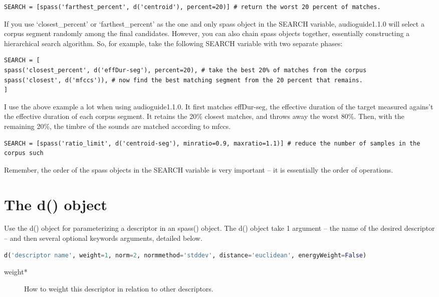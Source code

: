 \documentclass{article}
\newcommand{\ag}{audioguide1.1.0\xspace}
\begin{document}
\begin{spacing}{1.2}
\begin{lstlisting}
SEARCH = [spass('farthest_percent', d('centroid'), percent=20)] # return the worst 20 percent of matches.
\end{lstlisting}

If you use `closest\_percent' or `farthest\_percent' as the one and only spass object in the SEARCH variable, \ag will select a corpus segment randomly among the final candidates.  However, you can also chain spass objects together, essentially constructing a hierarchical search algorithm.  So, for example, take the following SEARCH variable with two separate phases:

\begin{lstlisting}
SEARCH = [
spass('closest_percent', d('effDur-seg'), percent=20), # take the best 20% of matches from the corpus
spass('closest', d('mfccs')), # now find the best matching segment from the 20 percent that remains.
] 
\end{lstlisting}

I use the above example a lot when using \ag.  It first matches effDur-seg, the effective duration of the target measured agains't the effective duration of each corpus segment.  It retains the 20\% closest matches, and throws away the worst 80\%.  Then, with the remaining 20\%, the timbre of the sounds are matched according to mfccs.

\begin{lstlisting}
SEARCH = [spass('ratio_limit', d('centroid-seg'), minratio=0.9, maxratio=1.1)] # reduce the number of samples in the corpus such 
\end{lstlisting}

Remember, the order of the spass objects in the SEARCH variable is very important -- it is essentially the order of operations.

\section{The d() object}
Use the d() object for parameterizing a descriptor in an spass() object.  The d() object take 1 argument -- the name of the desired descriptor --  and then several optional keywords arguments, detailed below.

 \begin{lstlisting}[language=python]
d('descriptor name', weight=1, norm=2, normmethod='stddev', distance='euclidean', energyWeight=False)
\end{lstlisting}
 
\begin{description}
\item[weight*] How to weight this descriptor in relation to other descriptors.


\end{description}
\end{spacing}
\end{document}
